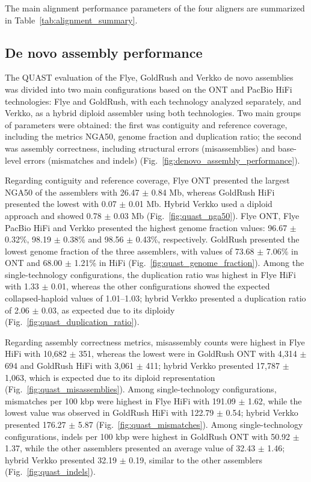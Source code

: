 \documentclass[12pt, letterpaper]{article}
\begin{document}
The main alignment performance parameters of the four aligners are summarized in Table~\ref{tab:alignment_summary}.

\subsection{De novo assembly performance}

The QUAST evaluation of the Flye, GoldRush and Verkko de novo assemblies was divided into two main configurations based on the ONT and PacBio HiFi technologies: Flye and GoldRush, with each technology analyzed separately, and Verkko, as a hybrid diploid assembler using both technologies. Two main groups of parameters were obtained: the first was contiguity and reference coverage, including the metrics NGA50, genome fraction and duplication ratio; the second was assembly correctness, including structural errors (misassemblies) and base-level errors (mismatches and indels) (Fig.~\ref{fig:denovo_assembly_performance}).

Regarding contiguity and reference coverage, Flye ONT presented the largest NGA50 of the assemblers with 26.47 $\pm$ 0.84 Mb, whereas GoldRush HiFi presented the lowest with 0.07 $\pm$ 0.01 Mb. Hybrid Verkko used a diploid approach and showed 0.78 $\pm$ 0.03 Mb (Fig.~\ref{fig:quast_nga50}). Flye ONT, Flye PacBio HiFi and Verkko presented the highest genome fraction values: 96.67 $\pm$ 0.32\%, 98.19 $\pm$ 0.38\% and 98.56 $\pm$ 0.43\%, respectively. GoldRush presented the lowest genome fraction of the three assemblers, with values of 73.68 $\pm$ 7.06\% in ONT and 68.00 $\pm$ 1.21\% in HiFi (Fig.~\ref{fig:quast_genome_fraction}). Among the single-technology configurations, the duplication ratio was highest in Flye HiFi with 1.33 $\pm$ 0.01, whereas the other configurations showed the expected collapsed-haploid values of 1.01--1.03; hybrid Verkko presented a duplication ratio of 2.06 $\pm$ 0.03, as expected due to its diploidy (Fig.~\ref{fig:quast_duplication_ratio}).

Regarding assembly correctness metrics, misassembly counts were highest in Flye HiFi with 10,682 $\pm$ 351, whereas the lowest were in GoldRush ONT with 4,314 $\pm$ 694 and GoldRush HiFi with 3,061 $\pm$ 411; hybrid Verkko presented 17,787 $\pm$ 1,063, which is expected due to its diploid representation (Fig.~\ref{fig:quast_misassemblies}). Among single-technology configurations, mismatches per 100 kbp were highest in Flye HiFi with 191.09 $\pm$ 1.62, while the lowest value was observed in GoldRush HiFi with 122.79 $\pm$ 0.54; hybrid Verkko presented 176.27 $\pm$ 5.87 (Fig.~\ref{fig:quast_mismatches}). Among single-technology configurations, indels per 100 kbp were highest in GoldRush ONT with 50.92 $\pm$ 1.37, while the other assemblers presented an average value of 32.43 $\pm$ 1.46; hybrid Verkko presented 32.19 $\pm$ 0.19, similar to the other assemblers (Fig.~\ref{fig:quast_indels}).
\end{document}
